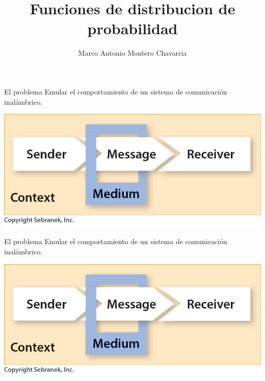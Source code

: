 \documentclass[pdf]{beamer}
\title{Funciones de distribucion de probabilidad}
\author{Marco Antonio Montero Chavarria}
\begin{document}
\begin{frame}
 \titlepage
\end{frame}


\begin{frame}{El problema}
Emular el comportamiento de un sistema de comunicación inalámbrico.
\begin{center}
\includegraphics[height=0.5\textheight]{CommunicationSituation.png}
\end{center}
\end{frame}
\begin{frame}{El problema}
Emular el comportamiento de un sistema de comunicación inalámbrico.
\begin{center}
\includegraphics[height=0.5\textheight]{CommunicationSituation.png}
\end{center}
\end{frame}
\end{document}
